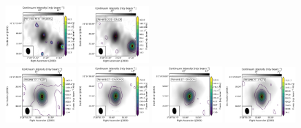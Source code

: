\begin{figure}[htbp!]
  \includegraphics[width=0.24\textwidth]{./moment0/Set2_ID07_2_CH3OCH3_259311.pdf}
  \includegraphics[width=0.24\textwidth]{./moment0/Set2_ID07_2_CH3CN_257527.pdf}
  \\
  \includegraphics[width=0.24\textwidth]{./moment0/Set2_ID03_CH3OH_243915.pdf}
  \includegraphics[width=0.24\textwidth]{./moment0/Set2_ID03_CH3OCHO_259342.pdf}
  \includegraphics[width=0.24\textwidth]{./moment0/Set2_ID03_CH3OCH3_259311.pdf}
  \includegraphics[width=0.24\textwidth]{./moment0/Set2_ID03_CH3CN_257527.pdf}
  \\
  \caption{}
\end{figure}
\addtocounter{figure}{-1}
